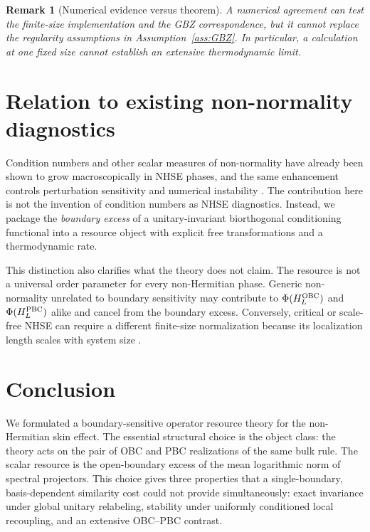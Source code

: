 \documentclass[reprint,amsmath,amssymb,aps,nofootinbib]{revtex4-2}
\newtheorem{remark}{Remark}
\newcommand{\PhiC}{\Phi}
\begin{document}
\begin{remark}[Numerical evidence versus theorem]
A numerical agreement can test the finite-size implementation and the
GBZ correspondence, but it cannot replace the regularity assumptions in
Assumption~\ref{ass:GBZ}. In particular, a calculation at one fixed size
cannot establish an extensive thermodynamic limit.
\end{remark}

\section{Relation to existing non-normality diagnostics}
\label{sec:prior}

Condition numbers and other scalar measures of non-normality have already
been shown to grow macroscopically in NHSE phases, and the same enhancement
controls perturbation sensitivity and numerical instability
\cite{NakaiEtAl2024,FengEtAl2025}. The contribution here is not the invention
of condition numbers as NHSE diagnostics. Instead, we package the
\emph{boundary excess} of a unitary-invariant biorthogonal conditioning
functional into a resource object with explicit free transformations and a
thermodynamic rate.

This distinction also clarifies what the theory does not claim. The resource
is not a universal order parameter for every non-Hermitian phase. Generic
non-normality unrelated to boundary sensitivity may contribute to
\(\PhiC(H_L^{\rm OBC})\) and \(\PhiC(H_L^{\rm PBC})\) alike and cancel from the
boundary excess. Conversely, critical or scale-free NHSE can require a
different finite-size normalization because its localization length scales
with system size \cite{LiSunYangLi}.

\section{Conclusion}
\label{sec:conclusion}

We formulated a boundary-sensitive operator resource theory for the
non-Hermitian skin effect. The essential structural choice is the object
class: the theory acts on the pair of OBC and PBC realizations of the same
bulk rule. The scalar resource is the open-boundary excess of the mean
logarithmic norm of spectral projectors. This choice gives three properties
that a single-boundary, basis-dependent similarity cost could not provide
simultaneously: exact invariance under global unitary relabeling, stability
under uniformly conditioned local recoupling, and an extensive OBC--PBC
contrast.
\end{document}
